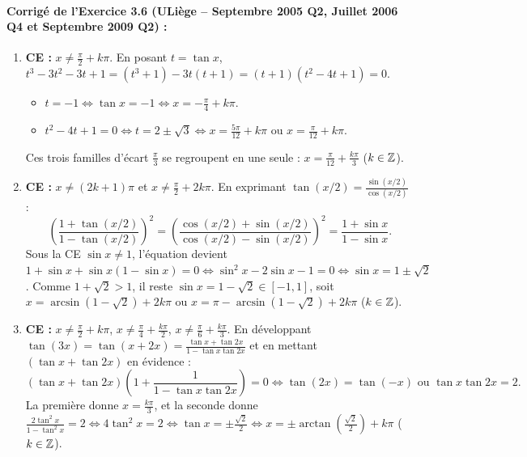 \paragraph{Corrigé de l'Exercice 3.6 (ULiège -- Septembre 2005 Q2, Juillet 2006 Q4 et Septembre 2009 Q2) :}
\begin{enumerate}[label=(\alph*)]
    \item \textbf{CE :} $x \neq \frac{\pi}{2} + k\pi$. En posant $t = \tan x$, $t^3 - 3t^2 - 3t + 1 = (t^3 + 1) - 3t(t + 1) = (t + 1)(t^2 - 4t + 1) = 0$.
    \begin{itemize}
        \item $t = -1 \iff \tan x = -1 \iff x = -\frac{\pi}{4} + k\pi$.
        \item $t^2 - 4t + 1 = 0 \iff t = 2 \pm \sqrt{3} \iff x = \frac{5\pi}{12} + k\pi$ ou $x = \frac{\pi}{12} + k\pi$.
    \end{itemize}
    Ces trois familles d'écart $\frac{\pi}{3}$ se regroupent en une seule : $\boxed{x = \frac{\pi}{12} + \frac{k\pi}{3}}$ ($k\in\mathbb{Z}$).
    \item \textbf{CE :} $x \neq (2k+1)\pi$ et $x \neq \frac{\pi}{2} + 2k\pi$. En exprimant $\tan(x/2) = \frac{\sin(x/2)}{\cos(x/2)}$ :
    \[
        \left(\frac{1 + \tan(x/2)}{1 - \tan(x/2)}\right)^2 = \left(\frac{\cos(x/2) + \sin(x/2)}{\cos(x/2) - \sin(x/2)}\right)^2 = \frac{1 + \sin x}{1 - \sin x}.
    \]
    Sous la CE $\sin x \neq 1$, l'équation devient $1 + \sin x + \sin x(1 - \sin x) = 0 \iff \sin^2 x - 2\sin x - 1 = 0 \iff \sin x = 1 \pm \sqrt{2}$. Comme $1+\sqrt{2} > 1$, il reste $\sin x = 1 - \sqrt{2} \in [-1, 1]$, soit $\boxed{x = \arcsin(1-\sqrt{2}) + 2k\pi \text{ ou } x = \pi - \arcsin(1-\sqrt{2}) + 2k\pi}$ ($k\in\mathbb{Z}$).
    \item \textbf{CE :} $x \neq \frac{\pi}{2}+k\pi$, $x \neq \frac{\pi}{4}+\frac{k\pi}{2}$, $x \neq \frac{\pi}{6}+\frac{k\pi}{3}$. En développant $\tan(3x) = \tan(x + 2x) = \frac{\tan x + \tan 2x}{1 - \tan x\tan 2x}$ et en mettant $(\tan x + \tan 2x)$ en évidence :
    \[
        (\tan x + \tan 2x)\left(1 + \frac{1}{1 - \tan x\tan 2x}\right) = 0 \iff \tan(2x) = \tan(-x) \text{ ou } \tan x\tan 2x = 2.
    \]
    La première donne $x = \frac{k\pi}{3}$, et la seconde donne $\frac{2\tan^2 x}{1-\tan^2 x} = 2 \iff 4\tan^2 x = 2 \iff \tan x = \pm\frac{\sqrt{2}}{2} \iff x = \pm\arctan\left(\frac{\sqrt{2}}{2}\right) + k\pi$ ($k\in\mathbb{Z}$).
\end{enumerate}

